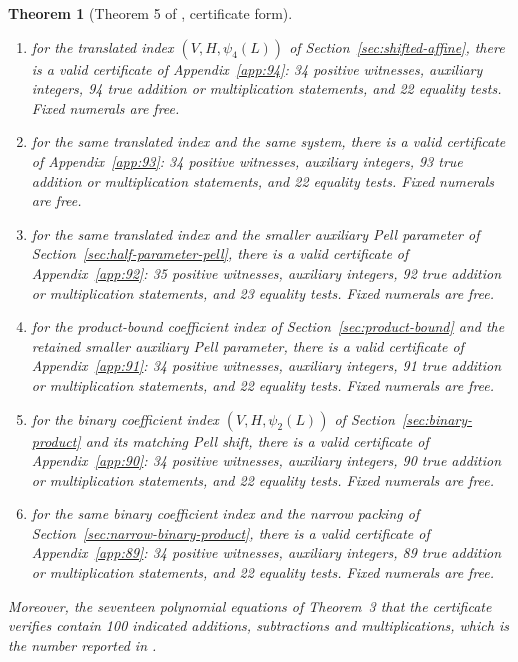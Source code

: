 \documentclass[11pt,letterpaper]{article}
\newtheorem{theorem}{Theorem}[section]
\theoremstyle{definition}
\theoremstyle{remark}
\numberwithin{equation}{section}
\begin{document}
\begin{theorem}[Theorem 5 of \cite{J80}, certificate form]
\begin{enumerate}[nosep,label=\textup{(\alph*)}]
 Appendix~\ref{app:95}: 34 positive witnesses, auxiliary integers,
 95 true addition or multiplication statements, and 22 equality tests.
 Fixed numerals are free.
\item for the translated index $(V,H,\psi_4(L))$ of
 Section~\ref{sec:shifted-affine}, there is a valid certificate of
 Appendix~\ref{app:94}: 34 positive witnesses, auxiliary integers,
 94 true addition or multiplication statements, and 22 equality tests.
 Fixed numerals are free.
\item[(aa)] for the same translated index and the same system, there is
 a valid certificate of Appendix~\ref{app:93}: 34 positive witnesses,
 auxiliary integers, 93 true addition or multiplication statements,
 and 22 equality tests. Fixed numerals are free.
\item[(ab)] for the same translated index and the smaller auxiliary
 Pell parameter of Section~\ref{sec:half-parameter-pell}, there is
 a valid certificate of Appendix~\ref{app:92}: 35 positive witnesses,
 auxiliary integers, 92 true addition or multiplication statements,
 and 23 equality tests. Fixed numerals are free.
\item[(ac)] for the product-bound coefficient index of
 Section~\ref{sec:product-bound} and the retained smaller auxiliary
 Pell parameter, there is a valid certificate of Appendix~\ref{app:91}:
 34 positive witnesses, auxiliary integers, 91 true addition or
 multiplication statements, and 22 equality tests. Fixed numerals
 are free.
\item[(ad)] for the binary coefficient index $(V,H,\psi_2(L))$ of
 Section~\ref{sec:binary-product} and its matching Pell shift, there
 is a valid certificate of Appendix~\ref{app:90}: 34 positive witnesses,
 auxiliary integers, 90 true addition or multiplication statements,
 and 22 equality tests. Fixed numerals are free.
\item[(ae)] for the same binary coefficient index and the narrow
 packing of Section~\ref{sec:narrow-binary-product}, there is a valid
 certificate of Appendix~\ref{app:89}: 34 positive witnesses,
 auxiliary integers, 89 true addition or multiplication statements,
 and 22 equality tests. Fixed numerals are free.
\end{enumerate}
Moreover, the seventeen polynomial equations of Theorem~3 that the
certificate verifies contain 100 indicated additions, subtractions and
multiplications, which is the number reported in \cite{J80}.
\end{theorem}
\end{document}
